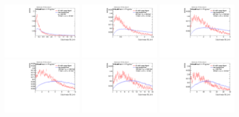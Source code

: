 \begin{figure}
\bigskip
\includegraphics[width=0.3\textwidth]{sascha_input/Appendix/Distributions/w/distributions/beta3/h_recoJet_D2_3_bin1.pdf} \hspace{1mm}
\includegraphics[width=0.3\textwidth]{sascha_input/Appendix/Distributions/w/distributions/beta3/h_recoJet_D2_3_bin2.pdf} \hspace{1mm}
\includegraphics[width=0.3\textwidth]{sascha_input/Appendix/Distributions/w/distributions/beta3/h_recoJet_D2_3_bin3.pdf} 
\bigskip
\includegraphics[width=0.3\textwidth]{sascha_input/Appendix/Distributions/w/distributions/beta3/h_recoJet_D2_3_bin4.pdf} \hspace{1mm}
\includegraphics[width=0.3\textwidth]{sascha_input/Appendix/Distributions/w/distributions/beta3/h_recoJet_D2_3_bin5.pdf} \hspace{1mm}
\includegraphics[width=0.3\textwidth]{sascha_input/Appendix/Distributions/w/distributions/beta3/h_recoJet_D2_3_bin6.pdf}

\end{figure}

